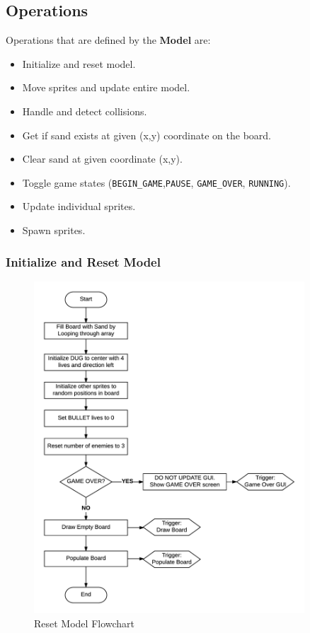     \subsection{Operations}

    Operations that are defined by the \textbf{Model} are:

    \begin{itemize}
      \item Initialize and reset model.
      \item Move sprites and update entire model.
      \item Handle and detect collisions.
      \item Get if sand exists at given (x,y) coordinate on the board.
      \item Clear sand at given coordinate (x,y).
      \item Toggle game states (\texttt{BEGIN\_GAME},\texttt{PAUSE}, \texttt{GAME\_OVER}, \texttt{RUNNING}).
      \item Update individual sprites.
      \item Spawn sprites.
    \end{itemize}

    \subsubsection{Initialize and Reset Model}

    \begin{figure}[H]
      \centering
      \includegraphics[width=0.9\textwidth]{images/reset-model.png}
      \caption{\label{fig:reset-model} Reset Model Flowchart}
    \end{figure}

